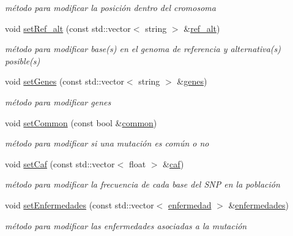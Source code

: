 \begin{DoxyCompactItemize}
\begin{DoxyCompactList}\small\item\em método para modificar la posición dentro del cromosoma \end{DoxyCompactList}\item 
void \hyperlink{classmutacion_af90752d5ce0e83943ea891ce995989f1}{set\+Ref\+\_\+alt} (const std\+::vector$<$ string $>$ \&\hyperlink{classmutacion_a2b3d0ed7547618562fae965d373b39e3}{ref\+\_\+alt})
\begin{DoxyCompactList}\small\item\em método para modificar base(s) en el genoma de referencia y alternativa(s) posible(s) \end{DoxyCompactList}\item 
void \hyperlink{classmutacion_a0cd370211bab4ae95120a68c57a92bed}{set\+Genes} (const std\+::vector$<$ string $>$ \&\hyperlink{classmutacion_af0048945b6062d6eb88b91db707993f6}{genes})
\begin{DoxyCompactList}\small\item\em método para modificar genes \end{DoxyCompactList}\item 
void \hyperlink{classmutacion_ab62d36e9bad78d43ace74fdaec909ca6}{set\+Common} (const bool \&\hyperlink{classmutacion_a6dabfef6167d64030f095887b15f65dd}{common})
\begin{DoxyCompactList}\small\item\em método para modificar si una mutación es común o no \end{DoxyCompactList}\item 
void \hyperlink{classmutacion_a447b9009932a64b2ed6269ed2577f865}{set\+Caf} (const std\+::vector$<$ float $>$ \&\hyperlink{classmutacion_aef3fe46b6a2d10e3993703ebd5d5be5f}{caf})
\begin{DoxyCompactList}\small\item\em método para modificar la frecuencia de cada base del S\+NP en la población \end{DoxyCompactList}\item 
void \hyperlink{classmutacion_a74da1d35cb0947b597ddf3b33e270d23}{set\+Enfermedades} (const std\+::vector$<$ \hyperlink{classenfermedad}{enfermedad} $>$ \&\hyperlink{classmutacion_ac8cca92dea1ab6fb9c193eed55a5ad28}{enfermedades})
\begin{DoxyCompactList}\small\item\em método para modificar las enfermedades asociadas a la mutación \end{DoxyCompactList}\item 

\end{DoxyCompactItemize}
